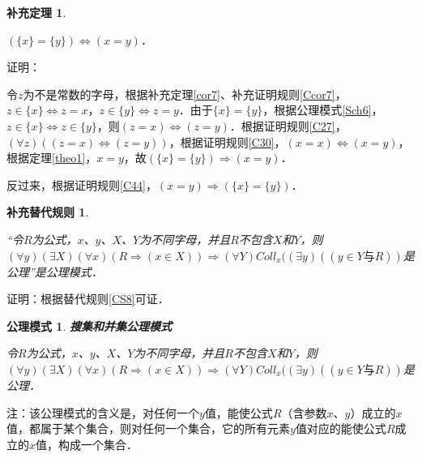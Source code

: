\documentclass[12pt, a4paper, oneside]{book}
\newtheorem{CScor}{补充替代规则}
\newtheorem{Sch}{公理模式}
\newtheorem{cor}{补充定理}
\begin{document}
			\begin{cor}\label{cor9}
				\hfill\par
				$(\{x\}=\{y\})\Leftrightarrow (x=y)$．
			\end{cor}
			证明：
			\par
			令$z$为不是常数的字母，根据补充定理\ref{cor7}、补充证明规则\ref{Ccor7}，$z\in \{x\}\Leftrightarrow z=x$，$z\in \{y\}\Leftrightarrow z=y$．由于$\{x\}=\{y\}$，根据公理模式\ref{Sch6}，$z\in \{x\}\Leftrightarrow z\in \{y\}$，则$(z=x)\Leftrightarrow (z=y)$．根据证明规则\ref{C27}，$(\forall z)((z=x)\Leftrightarrow (z=y))$，根据证明规则\ref{C30}，$(x=x)\Leftrightarrow (x=y)$，根据定理\ref{theo1}，$x=y$，故$(\{x\}=\{y\})\Rightarrow (x=y)$．
			\par
			反过来，根据证明规则\ref{C44}，$(x=y)\Rightarrow (\{x\}=\{y\})$．

			\begin{CScor}\label{CScor8}
				\hfill\par
				“令$R$为公式，$x$、$y$、$X$、$Y$为不同字母，并且$R$不包含$X$和$Y$，则$(\forall y)(\exists X)(\forall x)(R\Rightarrow(x\in X))\Rightarrow(\forall Y)Coll_x((\exists y)((y\in Y\text{与}R))$是公理”是公理模式．
			\end{CScor}
			证明：根据替代规则\ref{CS8}可证．

			\begin{Sch}\label{Sch8}
				\textbf{搜集和并集公理模式}
				\par
				令$R$为公式，$x$、$y$、$X$、$Y$为不同字母，并且$R$不包含$X$和$Y$，则$(\forall y)(\exists X)(\forall x)(R\Rightarrow(x\in X))\Rightarrow(\forall Y)Coll_x((\exists y)((y\in Y\text{与}R))$是公理．
			\end{Sch}
			注：该公理模式的含义是，对任何一个$y$值，能使公式$R$（含参数$x$、$y$）成立的$x$值，都属于某个集合，则对任何一个集合，它的所有元素$y$值对应的能使公式$R$成立的$x$值，构成一个集合．
\end{document}
